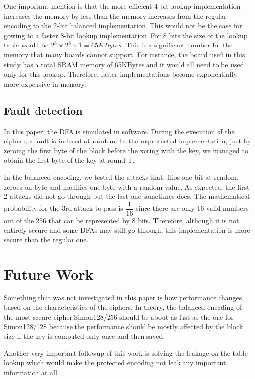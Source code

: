 \documentclass[conference]{IEEEtran}
\begin{document}
One important mention is that the more efficient 4-bit lookup implementation increases the memory by less than the memory increases from the regular encoding to the 2-bit balanced implementation. This would not be the case for gowing to a faster 8-bit lookup implementation. For 8 bits the size of the lookup table  would be
$2^{8} \times 2^{8} \times 1 = 65 KBytes$.
This is a significant number for the memory that many boards cannot support. For instance, the board used in this study has a total SRAM memory of 65KBytes and it would all need to be used only for this lookup. Therefore, faster implementations become exponentially more expensive in memory.

\subsection{Fault detection}

In this paper, the DFA is simulated in software. During the execution of the ciphers, a fault is induced at random. In the unprotected implementation, just by zeroing the first byte of the block before the xoring with the key, we managed to obtain the first byte of the key at round T.

In the balanced encoding, we tested the attacks that: flips one bit at random, zeroes on byte and modifies one byte with a random value. As expected, the first 2 attacks did not go through but the last one sometimes does. The mathematical probability for the 3rd attack to pass is $\dfrac{1}{16}$ since there are only 16 valid numbers out of the 256 that can be represented by 8 bits. Therefore, although it is not entirely secure and some DFAs may still go through, this implementation is more secure than the regular one.

\section{Future Work}

Something that was not investigated in this paper is how performance changes based on the characteristics of the ciphers. In theory, the balanced encoding of the most secure cipher Simon128/256 should be about as fast as the one for Simon128/128 because the performance should be mostly affected by the block size if the key is computed only once and then saved.

Another very important followup of this work is solving the leakage on the table lookup which would make the protected encoding not leak any important information at all.
\end{document}

